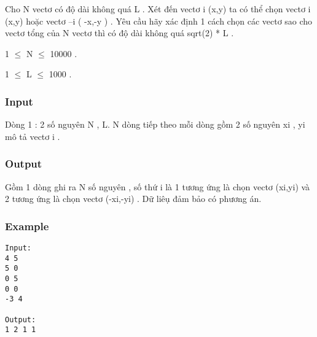 



   Cho N vectơ có độ dài không quá L . Xét đến vectơ i (x,y) ta có thể chọn vectơ i (x,y) hoặc vectơ –i ( -x,-y ) . Yêu cầu hãy xác định 1 cách chọn các vectơ sao cho vectơ tổng của N vectơ thì có độ dài không quá sqrt(2) * L .   


   1  $\le$  N  $\le$  10000 .   


   1  $\le$  L  $\le$  1000 .   




\subsubsection{   Input  }

   Dòng 1 : 2 số nguyên N , L. N dòng tiếp theo mỗi dòng gồm 2 số nguyên xi , yi mô tả vectơ i .  

\subsubsection{   Output  }

   Gồm 1 dòng ghi ra N số nguyên , số thứ i là 1 tương ứng là chọn vectơ (xi,yi) và 2 tương ứng là chọn vectơ (-xi,-yi) . Dữ liêụ đảm bảo có phương án.  

\subsubsection{   Example  }
\begin{verbatim}
Input:
4 5
5 0
0 5
0 0
-3 4

Output:
1 2 1 1
\end{verbatim}
